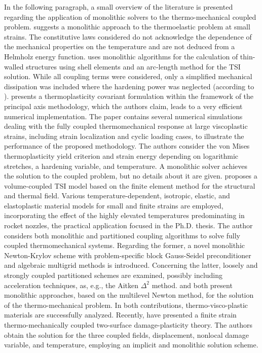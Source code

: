 In the following paragraph, a small overview of the literature is presented regarding the application of monolithic solvers to the thermo-mechanical coupled problem.
\cite{carter_finite_1989} suggests a monolithic approach to the thermoelastic problem at small strains.
The constitutive laws considered do not acknowledge the dependence of the mechanical properties on the temperature and are not deduced from a Helmholz energy function.
\cite{glaser_gekoppelte_1992} uses monolithic algorithms for the calculation of thin-walled structures using shell elements and an arc-length method for the TSI solution.
While all coupling terms were considered, only a simplified mechanical dissipation was included where the hardening power was neglected (according to \cite{danowski_computational_2014}).
\cite{ibrahimbegovic_covariant_2002} presents a thermoplasticity covariant formulation within the framework of the principal axis methodology, which the authors claim, leads to a very efficient numerical implementation.
The paper contains several numerical simulations dealing with the fully coupled thermomechanical response at large viscoplastic strains, including strain localization and cyclic loading cases, to illustrate the performance of the proposed methodology.
The authors consider the von Mises thermoplasticity yield criterion and strain energy depending on logarithmic stretches, a hardening variable, and temperature.
A monolithic solver achieves the solution to the coupled problem, but no details about it are given.
\cite{danowski_computational_2014} proposes a volume-coupled TSI model based on the finite element method for the structural and thermal field.
Various temperature-dependent, isotropic, elastic, and elastoplastic material models for small and finite strains are employed, incorporating the effect of the highly elevated temperatures predominating in rocket nozzles, the practical application focused in the Ph.D. thesis.
The author considers both monolithic and partitioned coupling algorithms to solve fully coupled thermomechanical systems.
Regarding the former,  a novel monolithic Newton-Krylov scheme with problem-specific block Gauss-Seidel preconditioner and algebraic multigrid methods is introduced.
Concerning the latter, loosely and strongly coupled partitioned schemes are examined, possibly including acceleration techniques, as, e.g., the Aitken \(\Delta^2\) method.
\cite{netz_high-order_2013} and \cite{rothe_monolithic_2015} both present monolithic approaches, based on the multilevel Newton method, for the solution of the thermo-mechanical problem.
In both contributions, thermo-visco-plastic materials are successfully analyzed.
Recently, \cite{felder_thermo-mechanically_2021} have presented a finite strain thermo-mechanically coupled two-surface damage-plasticity theory.
The authors obtain the solution for the three coupled fields, displacement, nonlocal damage variable, and temperature, employing an implicit and monolithic solution scheme.

